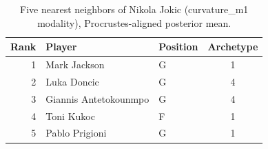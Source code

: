 \begin{table}[htbp]
  \centering\small
  \begin{tabular}{rllc}
    \toprule
    Rank & Player & Position & Archetype \\
    \midrule
    1 & Mark Jackson & G & 1 \\
    2 & Luka Doncic & G & 4 \\
    3 & Giannis Antetokounmpo & G & 4 \\
    4 & Toni Kukoc & F & 1 \\
    5 & Pablo Prigioni & G & 1 \\
    \bottomrule
  \end{tabular}
  \caption{Five nearest neighbors of Nikola Jokic (curvature_m1 modality), Procrustes-aligned posterior mean.}
  \label{tab:Nikola_Jokic_neighbors_curvature_m1}
\end{table}

